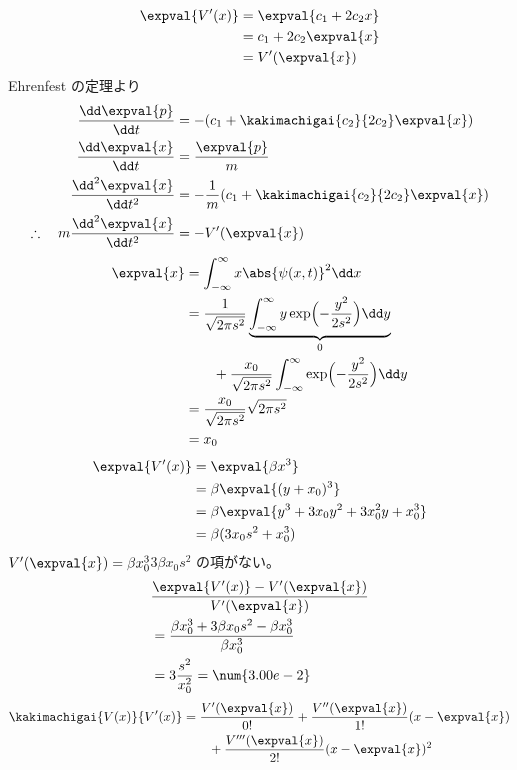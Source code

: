 \begin{align*}
\expval{V'(x)}&=\expval{c_{1}+2c_{2}x}\\
&=c_{1}+2c_{2}\expval{x}\\
&=V'(\expval{x})
\end{align*}
Ehrenfest の定理より
\begin{align*}
\frac{\dd\expval{p}}{\dd t}&=-(c_{1}+\kakimachigai{c_{2}}{2c_{2}}\expval{x})\\
\frac{\dd\expval{x}}{\dd t}&=\frac{\expval{p}}{m}\\
\frac{\dd^{2}\expval{x}}{\dd t^{2}}&=-\frac{1}{m}(c_{1}+\kakimachigai{c_{2}}{2c_{2}}\expval{x})\\
\therefore\quad m\frac{\dd^{2}\expval{x}}{\dd t^{2}}&=-V'(\expval{x})
\end{align*}
\begin{align*}
\expval{x}&=\int_{-\infty}^{\infty}x\abs{\psi(x,t)}^{2}\dd x\\
&=\frac{1}{\sqrt{2\pi s^{2}}}\underbrace{\int_{-\infty}^{\infty}y\exp\Bigl(-\frac{y^{2}}{2s^{2}}\Bigr)\dd y}_{0}\\
&\qquad+\frac{x_{0}}{\sqrt{2\pi s^{2}}}\int_{-\infty}^{\infty}\exp\Bigl(-\frac{y^{2}}{2s^{2}}\Bigr)\dd y\\
&=\frac{x_{0}}{\sqrt{2\pi s^{2}}}\sqrt{2\pi s^{2}}\\
&=x_{0}
\end{align*}
\begin{align*}
\expval{V'(x)}&=\expval{\beta x^{3}}\\
&=\beta\expval{(y+x_{0})^{3}}\\
&=\beta\expval{y^{3}+3x_{0}y^{2}+3x_{0}^{2}y+x_{0}^{3}}\\
&=\beta(3x_{0}s^{2}+x_{0}^{3})
\end{align*}
$V'(\expval{x})=\beta x_{0}^{3}$\quad $3\beta x_{0}s^{2}$ の項がない。
\begin{align*}
&\frac{\expval{V'(x)}-V'(\expval{x})}{V'(\expval{x})}\\
&=\frac{\beta x_{0}^{3}+3\beta x_{0}s^{2}-\beta x_{0}^{3}}{\beta x_{0}^{3}}\\
&=3\frac{s^{2}}{x_{0}^{2}}=\num{3.00e-2}
\end{align*}
\begin{align*}
\kakimachigai{V(x)}{V'(x)}&=\frac{V'(\expval{x})}{0!}+\frac{V''(\expval{x})}{1!}(x-\expval{x})\\
&\qquad+\frac{V'''(\expval{x})}{2!}(x-\expval{x})^{2}
\end{align*}
